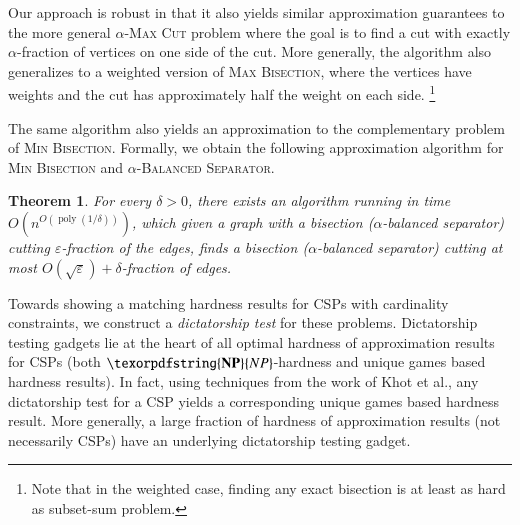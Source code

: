 \documentclass[11pt]{article}
\newtheorem{theorem}{Theorem}[section]
\theoremstyle{definition}
\DeclareMathOperator{\poly}{poly}
\newcommand{\etal}{et al.\xspace}
\newcommand{\problemmacro}[1]{\texorpdfstring{\textsc{#1}}{#1}\xspace}
\newcommand{\maxcut}{\problemmacro{Max Cut}}
\newcommand{\balancedseparator}{\problemmacro{Balanced Separator}}
\newcommand{\minbisection}{\problemmacro{Min Bisection}}
\newcommand{\maxbisection}{\problemmacro{Max Bisection}}
\let\epsilon=\varepsilon
\numberwithin{equation}{section}
\newcommand{\cclassmacro}[1]{\texorpdfstring{\textbf{#1}}{#1}\xspace}
\newcommand{\NP}{\cclassmacro{NP}}
\begin{document}
Our approach is robust in that it also yields similar
approximation guarantees to the more general $\alpha$-\maxcut problem
where the goal is to find a cut with exactly $\alpha$-fraction of
vertices on one side of the cut.  More generally, the algorithm also
generalizes to a weighted version of \maxbisection, where the vertices
have weights and the cut has approximately half the weight on each
side.  \footnote{Note that in the weighted case, finding any exact bisection is at least as
hard as subset-sum problem.}

The same algorithm also yields an approximation to the complementary
problem of \minbisection.  Formally, we obtain the following
approximation algorithm for \minbisection and
$\alpha$-\balancedseparator.

\begin{theorem} \label{thm:minbisection}
For every $\delta > 0$, there exists an algorithm running in time
$O(n^{O(\poly(1/\delta))})$, which given a graph with a bisection ($\alpha$-balanced separator) cutting
$\epsilon$-fraction of the edges, finds a bisection ($\alpha$-balanced separator) cutting at most
$O(\sqrt{\epsilon})+\delta$-fraction of edges.
\end{theorem}

Towards showing a matching hardness results for CSPs with cardinality
constraints, we construct a {\it dictatorship test} for these
problems.  Dictatorship testing gadgets lie at the heart of all
optimal hardness of approximation results for CSPs (both
$\NP$-hardness and unique games based hardness results).  In fact,
using techniques from the work of Khot \etal \cite{KhotKMO07}, any
dictatorship test for a CSP yields a corresponding unique games based
hardness result.  More generally, a large fraction of hardness of
approximation results (not necessarily CSPs) have an underlying
dictatorship testing gadget.
\end{document}
